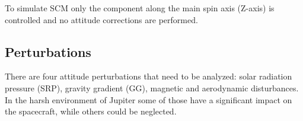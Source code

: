 \begin{itemize}
    To simulate SCM only the component along the main spin axis (Z-axis) is controlled and no attitude corrections are performed.      


\end{itemize}

\subsection{Perturbations}
\label{subsec:perturbations}

There are four attitude perturbations that need to be analyzed: solar radiation pressure (SRP), gravity gradient (GG), magnetic and aerodynamic disturbances. In the harsh environment of Jupiter some of those have a significant impact on the spacecraft, while others could be neglected. 

